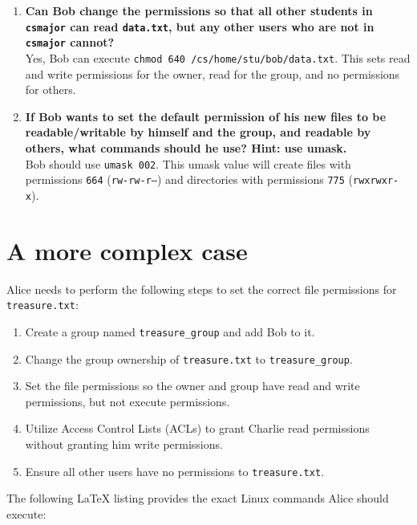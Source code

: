 \documentclass{article}
\begin{document}
\begin{enumerate}
    \item \textbf{Can Bob change the permissions so that all other students in \texttt{csmajor} can read \texttt{data.txt}, but any other users who are not in \texttt{csmajor} cannot?}\\
    Yes, Bob can execute \texttt{chmod 640 /cs/home/stu/bob/data.txt}. This sets read and write permissions for the owner, read for the group, and no permissions for others.
    
    \item \textbf{If Bob wants to set the default permission of his new files to be readable/writable by himself and the group, and readable by others, what commands should he use? Hint: use umask.}\\
    Bob should use \texttt{umask 002}. This umask value will create files with permissions \texttt{664} (\texttt{rw-rw-r--}) and directories with permissions \texttt{775} (\texttt{rwxrwxr-x}).
\end{enumerate}

\section*{A more complex case}

Alice needs to perform the following steps to set the correct file permissions for \texttt{treasure.txt}:

\begin{enumerate}
    \item Create a group named \texttt{treasure\_group} and add Bob to it.
    \item Change the group ownership of \texttt{treasure.txt} to \texttt{treasure\_group}.
    \item Set the file permissions so the owner and group have read and write permissions, but not execute permissions.
    \item Utilize Access Control Lists (ACLs) to grant Charlie read permissions without granting him write permissions.
    \item Ensure all other users have no permissions to \texttt{treasure.txt}.
\end{enumerate}

The following LaTeX listing provides the exact Linux commands Alice should execute:
\end{document}
